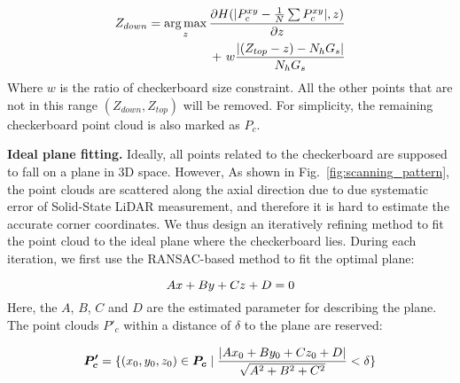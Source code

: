 \documentclass[journal]{vgtc}
\DeclareMathOperator*{\argmax}{arg\,max}
\begin{document}
\begin{equation}
	\label{eq:lowboundary}
	\centering
	\begin{aligned}
		Z_{down}=\argmax_{z}                                           
		{                                                              
		\frac                                                          
		{\partial {H(| P^{xy}_c - \frac{1}{N} \sum P^{xy}_c |, z)} } 
		{\partial {z}}                                                 
		}                                                              
		                                                               \\
		+ ~                                                            
		w \frac                                                        
		{| (Z_{top} - z) - N_h G_s |}                                  
		{N_h G_s}                                                      
	\end{aligned}
\end{equation}
Where $w$ is the ratio of checkerboard size constraint. All the other points that are not in this range $(Z_{down}, Z_{top})$ will be removed. For simplicity, the remaining checkerboard point cloud is also marked as $P_c$.

\textbf{Ideal plane fitting.} Ideally, all points related to the checkerboard are supposed to fall on a plane in 3D space. However, As shown in Fig.~\ref{fig:scanning_pattern}, the point clouds are scattered along the axial direction due to due systematic error of Solid-State LiDAR measurement, and therefore it is hard to estimate the accurate corner coordinates. We thus design an iteratively refining method to fit the point cloud to the ideal plane where the checkerboard lies. During each iteration, we first use the RANSAC-based method to fit the optimal plane:

\begin{equation}
	\label{eq:iplane}
	\centering
	Ax+By+Cz+D=0
\end{equation}
Here, the $A$, $B$, $C$ and $D$ are the estimated parameter for describing the plane. The point clouds ${P'_c}$ within a distance of $\delta$ to the plane are reserved:

\begin{equation}
	\label{eq:fitting}
	\centering
	\bm {P'_c} = 
	\{
	(x_0,y_0,z_0) \in \bm {P_c}
	\mid
	\frac{|Ax_0+By_0+Cz_0+D|}{\sqrt{A^2 + B^2 + C^2}} < \delta
	\}
\end{equation}
\end{document}

